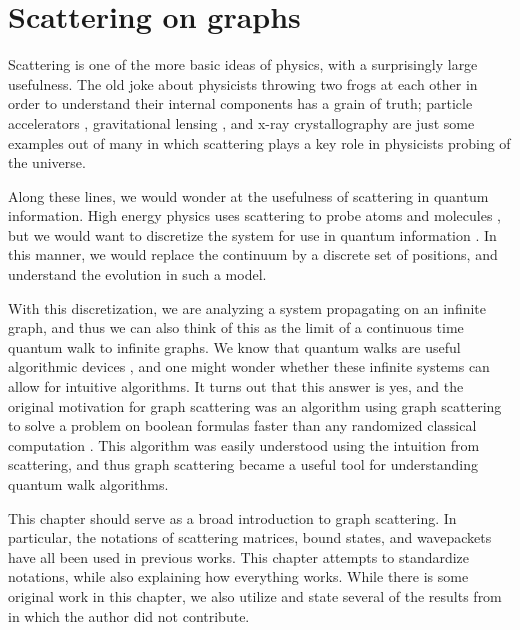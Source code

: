\documentclass[../thesis-main/thesis-main]{subfiles}
\begin{document}
\chapter{Scattering on graphs}


Scattering is one of the more basic ideas of physics, with a surprisingly large usefulness.  The old joke about physicists throwing two frogs at each other  in order to understand their internal components has a grain of truth; particle accelerators , gravitational lensing , and x-ray crystallography  are just some examples out of many in which scattering plays a key role in physicists probing of the universe.

Along these lines, we would wonder at the usefulness of scattering in quantum information.  High energy physics uses scattering to probe atoms and molecules , but we would want to discretize the system for use in quantum information .  In this manner, we would replace the continuum by a discrete set of positions, and understand the evolution in such a model.

With this discretization, we are analyzing a system propagating on an infinite graph, and thus we can also think of this as the limit of a continuous time quantum walk to infinite graphs.  We know that quantum walks are useful algorithmic devices , and one might wonder whether these infinite systems can allow for intuitive algorithms.  It turns out that this answer is yes, and the original motivation for graph scattering was an algorithm using graph scattering to solve a problem on boolean formulas faster than any randomized classical computation \cite{FGG08}.  This algorithm was easily understood using the intuition from scattering, and thus graph scattering became a useful tool for understanding quantum walk algorithms.

This chapter should serve as a broad introduction to graph scattering.  In particular, the notations of scattering matrices, bound states, and wavepackets have all been used in previous works.  This chapter attempts to standardize notations, while also explaining how everything works.  While there is some original work in this chapter, we also utilize and state several of the results from \cite{FGG08,Chi09,CS11,CG12} in which the author did not contribute.
\end{document}
